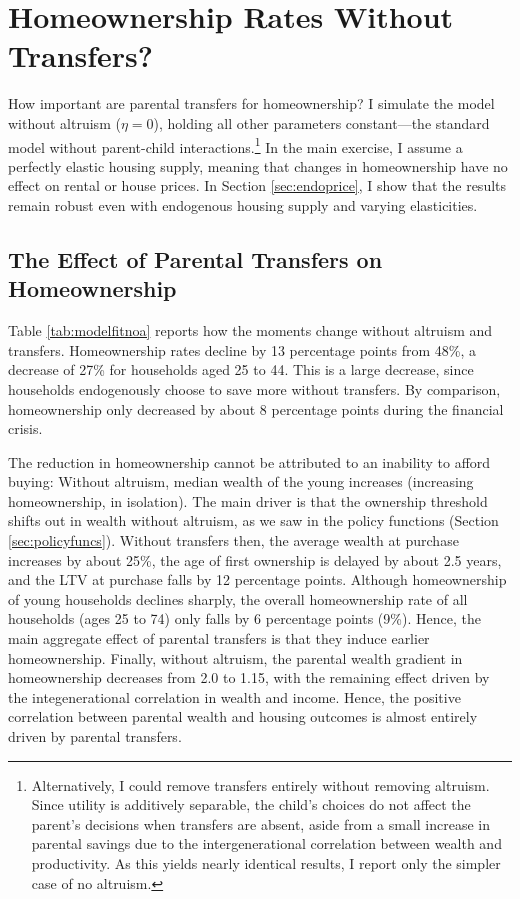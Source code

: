 \documentclass[12pt]{article}
\begin{document}
\section{Homeownership Rates Without Transfers?}\label{sec:quant}
How important are parental transfers for homeownership? I simulate the model without altruism ($\eta=0$), holding all other parameters constant---the standard model without parent-child interactions.\footnote{Alternatively, I could remove transfers entirely without removing altruism. Since utility is additively separable, the child's choices do not affect the parent's decisions when transfers are absent, aside from a small increase in parental savings due to the intergenerational correlation between wealth and productivity. As this yields nearly identical results, I report only the simpler case of no altruism.} In the main exercise, I assume a perfectly elastic housing supply, meaning that changes in homeownership have no effect on rental or house prices. In Section \ref{sec:endoprice}, I show that the results remain robust even with endogenous housing supply and varying elasticities.

\subsection{The Effect of Parental Transfers on Homeownership}
Table \ref{tab:modelfitnoa} reports how the moments change without altruism and transfers. Homeownership rates decline by 13 percentage points from 48\%, a decrease of 27\% for households aged 25 to 44. This is a large decrease, since households endogenously choose to save more without transfers. By comparison, homeownership only decreased by about 8 percentage points during the financial crisis.

The reduction in homeownership cannot be attributed to an inability to afford buying: Without altruism, median wealth of the young increases (increasing homeownership, in isolation). The main driver is that the ownership threshold shifts out in wealth without altruism, as we saw in the policy functions (Section \ref{sec:policyfuncs}). Without transfers then, the average wealth at purchase increases by about 25\%, the age of first ownership is delayed by about 2.5 years, and the LTV at purchase falls by 12 percentage points. Although homeownership of young households declines sharply, the overall homeownership rate of all households (ages 25 to 74) only falls by 6 percentage points (9\%). Hence, the main aggregate effect of parental transfers is that they induce earlier homeownership. Finally, without altruism, the parental wealth gradient in homeownership decreases from 2.0 to 1.15, with the remaining effect driven by the integenerational correlation in wealth and income. Hence, the positive correlation between parental wealth and housing outcomes is almost entirely driven by parental transfers.
\end{document}
